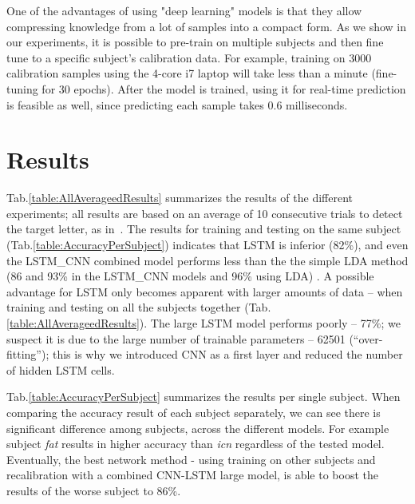 \documentclass[
12pt, %
english, %
doublespacing, %
headsepline, %
]{MastersDoctoralThesis} %
\begin{document}
One of the advantages of using "deep learning" models is that they allow compressing knowledge from a lot of samples into a compact form. As we show in our experiments, it is possible to pre-train on multiple subjects and then fine tune to a specific subject's calibration data. For example, training on 3000 calibration samples using the 4-core i7 laptop will take less than a minute (fine-tuning for 30 epochs). After the model is trained, using it for real-time prediction is feasible as well, since predicting each sample takes 0.6 milliseconds.

\chapter{Results}

Tab.\ref{table:AllAverageedResults} summarizes the results of the different experiments; all results are based on an average of 10 consecutive trials to detect the target letter, as in~\cite{BlaknertzExperiment}. The results for training and testing on the same subject (Tab.\ref{table:AccuracyPerSubject}) indicates that LSTM is inferior (82\%), and even the LSTM\_CNN combined model performs less than the the simple LDA method (86 and 93\% in the LSTM\_CNN models and 96\% using LDA) . A possible advantage for LSTM only becomes apparent with larger amounts of data -- when training and testing on all the subjects together (Tab.\ref{table:AllAverageedResults}). The large LSTM model performs poorly -- 77\%; we suspect it is due to the large number of trainable parameters -- 62501 (``over-fitting''); this is why we introduced CNN as a first layer and reduced the number of hidden LSTM cells.

Tab.\ref{table:AccuracyPerSubject} summarizes the results per single subject. When comparing the accuracy result of each subject separately, we can see there is significant difference among subjects, across the different models. For example subject \textit{fat} results in higher accuracy than \textit{icn} regardless of the tested model. Eventually, the best network method - using training on other subjects and recalibration with a combined CNN-LSTM large model, is able to boost the results of the worse subject to 86\%.
\end{document}
